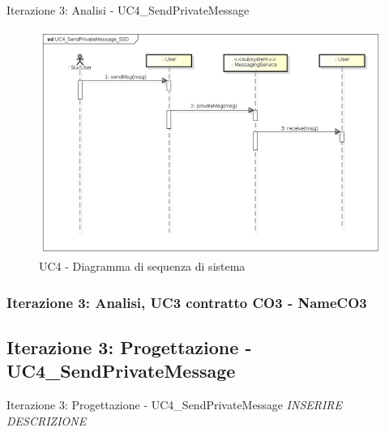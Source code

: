 \documentclass[t]{beamer} %
\begin{document}
\begin{frame} {Iterazione 3: Analisi - UC4\_SendPrivateMessage}
   \begin{figure}
     \includegraphics[scale=0.33]{image_astah/Iteration_3_DomainModel/UC4_SendPrivateMessage_SSD.png}{\centering}
     \caption{UC4 - Diagramma di sequenza di sistema}
     \label{fig_UC4_SPM_SSD} 
   \end{figure}
\end{frame}

\begin{frame}
 \frametitle{Iterazione 3: Analisi, UC3 contratto CO3 - NameCO3}
  \begin{table}[!htbp]
   \caption {UC3 Contratto CO3 - NameCO3}
    \label{table:1}
   \end{table}
\end{frame}

\subsection{Iterazione 3: Progettazione - UC4\_SendPrivateMessage}
\begin{frame} {Iterazione 3: Progettazione - UC4\_SendPrivateMessage}
  \emph{INSERIRE DESCRIZIONE}
\end{frame}
\end{document}

